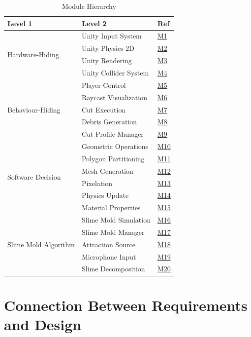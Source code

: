 \documentclass[12pt, titlepage]{article}
\begin{document}
\begin{table}[H]
\centering
\begin{tabular}{|p{}|p{}|p{}|}
\hline
\textbf{Level 1} & \textbf{Level 2} & \textbf{Ref}\\
\hline
\multirow{4}{*}{Hardware-Hiding} & Unity Input System & \hyperref[M1]{M1}\\
& Unity Physics 2D & \hyperref[M2]{M2}\\
& Unity Rendering & \hyperref[M3]{M3}\\
& Unity Collider System & \hyperref[M4]{M4}\\
\hline
\multirow{5}{*}{Behaviour-Hiding} & Player Control & \hyperref[M5]{M5}\\
& Raycast Visualization & \hyperref[M6]{M6}\\
& Cut Execution & \hyperref[M7]{M7}\\
& Debris Generation & \hyperref[M8]{M8}\\
& Cut Profile Manager & \hyperref[M9]{M9}\\
\hline
\multirow{6}{*}{Software Decision} & Geometric Operations & \hyperref[M10]{M10}\\
& Polygon Partitioning & \hyperref[M11]{M11}\\
& Mesh Generation & \hyperref[M12]{M12}\\
& Pixelation & \hyperref[M13]{M13}\\
& Physics Update & \hyperref[M14]{M14}\\
& Material Properties & \hyperref[M15]{M15}\\
\hline
\multirow{5}{*}{Slime Mold Algorithm} & Slime Mold Simulation & \hyperref[M16]{M16}\\
& Slime Mold Manager & \hyperref[M17]{M17}\\
& Attraction Source & \hyperref[M18]{M18}\\
& Microphone Input & \hyperref[M19]{M19}\\
& Slime Decomposition & \hyperref[M20]{M20}\\
\hline

\end{tabular}
\caption{Module Hierarchy}
\label{TblMH}
\end{table}

\section{Connection Between Requirements and Design} \label{SecConnection}
\end{document}
